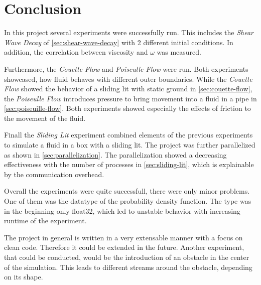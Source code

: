 \chapter{Conclusion}\label{ch:conclusion}
In this project several experiments were successfully run.
This includes the \textit{Shear Wave Decay} of \cref{sec:shear-wave-decay} with 2 different initial conditions.
In addition, the correlation between viscosity and $\omega$ was measured.

Furthermore, the \textit{Couette Flow} and \textit{Poiseulle Flow} were run.
Both experiments showcased, how fluid behaves with different outer boundaries.
While the \textit{Couette Flow} showed the behavior of a sliding lit with static ground in \cref{sec:couette-flow}, the \textit{Poiseulle Flow} introduces pressure to bring movement into a fluid in a pipe in \cref{sec:poiseuille-flow}.
Both experiments showed especially the effects of friction to the movement of the fluid.

Finall the \textit{Sliding Lit} experiment combined elements of the previous experiments to simulate a fluid in a box with a sliding lit.
The project was further parallelized as shown in \cref{sec:parallelization}.
The parallelization showed a decreasing effectiveness with the number of processes in \cref{sec:sliding-lit}, which is explainable by the communication overhead.
\newline

Overall the experiments were quite successfull, there were only minor problems.
One of them was the datatype of the probability density function.
The type was in the beginning only float32, which led to unstable behavior with increasing runtime of the experiment.
\newline

The project in general is written in a very extensable manner with a focus on clean code.
Therefore it could be extended in the future.
Another experiment, that could be conducted, would be the introduction of an obstacle in the center of the simulation.
This leads to different streams around the obstacle, depending on its shape.
